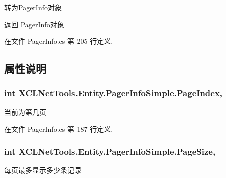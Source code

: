 转为\-Pager\-Info对象 

\begin{DoxyReturn}{返回}
Pager\-Info对象
\end{DoxyReturn}


在文件 Pager\-Info.\-cs 第 205 行定义.



\subsection{属性说明}
\hypertarget{class_x_c_l_net_tools_1_1_entity_1_1_pager_info_simple_a92e66733aad9fb09cec9df1fdb39beb2}{
\subsubsection[{Page\-Index}]{\setlength{\rightskip}{0pt plus 5cm}int X\-C\-L\-Net\-Tools.\-Entity.\-Pager\-Info\-Simple.\-Page\-Index\hspace{0.3cm}{\ttfamily [get]}, {\ttfamily [set]}}}\label{class_x_c_l_net_tools_1_1_entity_1_1_pager_info_simple_a92e66733aad9fb09cec9df1fdb39beb2}


当前为第几页 



在文件 Pager\-Info.\-cs 第 187 行定义.

\hypertarget{class_x_c_l_net_tools_1_1_entity_1_1_pager_info_simple_a3a8883f09f14d322edc5e8be13f75cb6}{
\subsubsection[{Page\-Size}]{\setlength{\rightskip}{0pt plus 5cm}int X\-C\-L\-Net\-Tools.\-Entity.\-Pager\-Info\-Simple.\-Page\-Size\hspace{0.3cm}{\ttfamily [get]}, {\ttfamily [set]}}}\label{class_x_c_l_net_tools_1_1_entity_1_1_pager_info_simple_a3a8883f09f14d322edc5e8be13f75cb6}


每页最多显示多少条记录 



